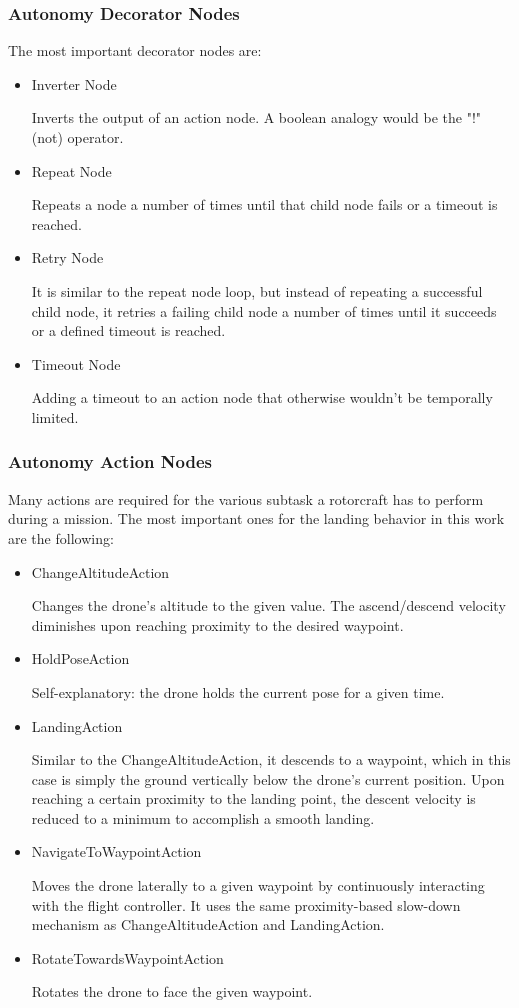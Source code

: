 \subsubsection{Autonomy Decorator Nodes}\label{subsubsec:decorator_nodes}

The most important decorator nodes are:

\begin{itemize}
    \item Inverter Node
    
    Inverts the output of an action node. A boolean analogy would be the "!" (not) operator.
    \item Repeat Node
    
    Repeats a node a number of times until that child node fails or a timeout is reached. 
    \item Retry Node
    
    It is similar to the repeat node loop, but instead of repeating a successful child node, it retries a failing child node a number of times until it succeeds or a defined timeout is reached.
    \item Timeout Node
    
    Adding a timeout to an action node that otherwise wouldn't be temporally limited.
\end{itemize}

\subsubsection{Autonomy Action Nodes}\label{subsubsec:setup:action_nodes}

Many actions are required for the various subtask a rotorcraft has to perform during a mission. The most important ones for the landing behavior in this work are the following:

\begin{itemize}
    \item ChangeAltitudeAction
    
    Changes the drone's altitude to the given value. The ascend/descend velocity diminishes upon reaching proximity to the desired waypoint.
    \item HoldPoseAction
    
    Self-explanatory: the drone holds the current pose for a given time.
    \item LandingAction
    
    Similar to the ChangeAltitudeAction, it descends to a waypoint, which in this case is simply the ground vertically below the drone's current position. Upon reaching a certain proximity to the landing point, the descent velocity is reduced to a minimum to accomplish a smooth landing.
    \item NavigateToWaypointAction
    
    Moves the drone laterally to a given waypoint by continuously interacting with the flight controller. It uses the same proximity-based slow-down mechanism as ChangeAltitudeAction and LandingAction.
    \item RotateTowardsWaypointAction
    
    Rotates the drone to face the given waypoint.
\end{itemize}

